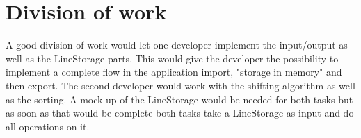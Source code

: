 \section{Division of work}
A good division of work would let one developer implement the input/output as well
as the LineStorage parts. This would give the developer the possibility to implement
a complete flow in the application import, "storage in memory" and then export.
The second developer would work with the shifting algorithm as well as the sorting.
A mock-up of the LineStorage would be needed for both tasks but as soon as that
would be complete both tasks take a LineStorage as input and do all operations on it.

